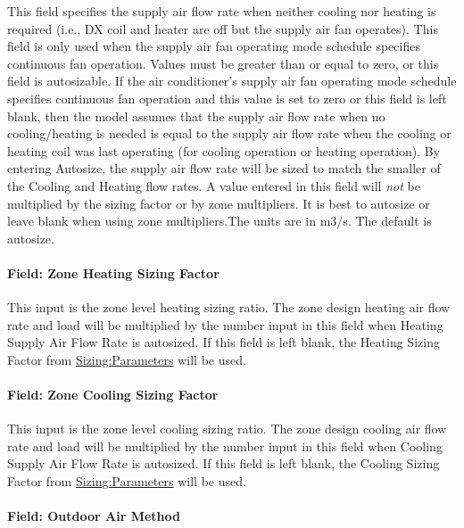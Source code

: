 This field specifies the supply air flow rate when neither cooling nor heating is required (i.e., DX coil and heater are off but the supply air fan operates). This field is only used when the supply air fan operating mode schedule specifies continuous fan operation. Values must be greater than or equal to zero, or this field is autosizable. If the air conditioner's supply air fan operating mode schedule specifies continuous fan operation and this value is set to zero or this field is left blank, then the model assumes that the supply air flow rate when no cooling/heating is needed is equal to the supply air flow rate when the cooling or heating coil was last operating (for cooling operation or heating operation). By entering Autosize, the supply air flow rate will be sized to match the smaller of the Cooling and Heating flow rates. A value entered in this field will \emph{not} be multiplied by the sizing factor or by zone multipliers. It is best to autosize or leave blank when using zone multipliers.The units are in m3/s. The default is autosize.

\paragraph{Field: Zone Heating Sizing Factor}\label{field-zone-heating-sizing-factor-2}

This input is the zone level heating sizing ratio. The zone design heating air flow rate and load will be multiplied by the number input in this field when Heating Supply Air Flow Rate is autosized. If this field is left blank, the Heating Sizing Factor from \hyperref[sizingparameters]{Sizing:Parameters} will be used.

\paragraph{Field: Zone Cooling Sizing Factor}\label{field-zone-cooling-sizing-factor-1}

This input is the zone level cooling sizing ratio. The zone design cooling air flow rate and load will be multiplied by the number input in this field when Cooling Supply Air Flow Rate is autosized. If this field is left blank, the Cooling Sizing Factor from \hyperref[sizingparameters]{Sizing:Parameters} will be used.

\paragraph{Field: Outdoor Air Method}\label{field-outdoor-air-method-3}

